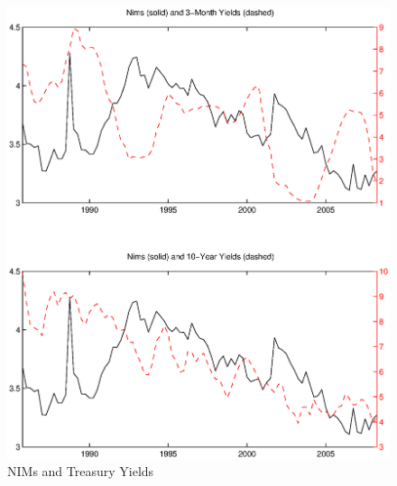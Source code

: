 \documentclass[11pt]{article}
\begin{document}
\begin{frame}
\newpage \clearpage
\begin{figure}
\caption{NIMs and Treasury Yields} \label{figure_nims_rates}
\center
\includegraphics[scale=0.85]{figure_nims_rates.ps}
\end{figure}


\end{frame}
\end{document}

